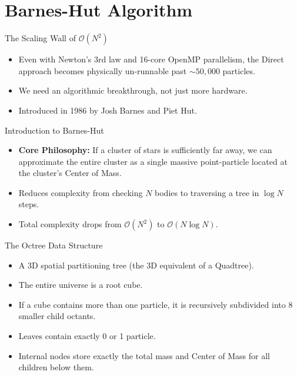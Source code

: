 \documentclass[aspectratio=169]{beamer}
\begin{document}
\section{Barnes-Hut Algorithm}
\begin{frame}{The Scaling Wall of $\mathcal{O}(N^2)$}
    \begin{itemize}
        \item Even with Newton's 3rd law and 16-core OpenMP parallelism, the Direct approach becomes physically un-runnable past $\sim 50,000$ particles.
        \item We need an algorithmic breakthrough, not just more hardware.
        \item Introduced in 1986 by Josh Barnes and Piet Hut.
    \end{itemize}
\end{frame}

\begin{frame}{Introduction to Barnes-Hut}
    \begin{itemize}
        \item \textbf{Core Philosophy:} If a cluster of stars is sufficiently far away, we can approximate the entire cluster as a single massive point-particle located at the cluster's Center of Mass.
        \item Reduces complexity from checking $N$ bodies to traversing a tree in $\log N$ steps.
        \item Total complexity drops from $\mathcal{O}(N^2)$ to $\mathcal{O}(N \log N)$.
    \end{itemize}
\end{frame}

\begin{frame}{The Octree Data Structure}
    \begin{itemize}
        \item A 3D spatial partitioning tree (the 3D equivalent of a Quadtree).
        \item The entire universe is a root cube.
        \item If a cube contains more than one particle, it is recursively subdivided into 8 smaller child octants.
        \item Leaves contain exactly 0 or 1 particle.
        \item Internal nodes store exactly the total mass and Center of Mass for all children below them.
    \end{itemize}
\end{frame}
\end{document}
